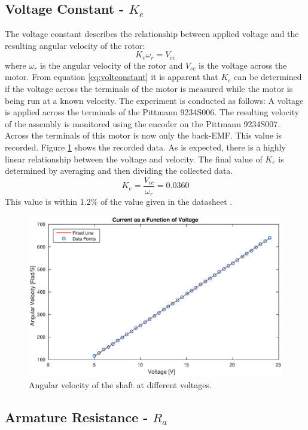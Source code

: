 \subsection{Voltage Constant - $K_e$}
\label{sec:voltconstat}
The voltage constant describes the relationship between applied voltage and the resulting angular velocity of the rotor:
\begin{equation}
	\label{eq:voltconstant}
	K_e\omega_r = V_{cc}
\end{equation}
where $\omega_r$ is the angular velocity of the rotor and $V_{cc}$ is the voltage across the motor.
From equation \ref{eq:voltconstant} it is apparent that $K_e$ can be determined if the voltage across the terminals of the motor is measured while the motor is being run at a known velocity.
The experiment is conducted as follows:
A voltage is applied across the terminals of the Pittmann 9234S006.
The resulting velocity of the assembly is monitored using the encoder on the Pittmann 9234S007.
Across the terminals of this motor is now only the back-EMF.
This value is recorded.
Figure \ref{fig:velvsvolt} shows the recorded data. 
As is expected, there is a highly linear relationship between the voltage and velocity.
The final value of $K_e$ is determined by averaging and then dividing the collected data.
$$K_e=\frac{V_{cc}}{\omega_r}=0.0360$$
This value is within 1.2\% of the value given in the datasheet \cite{pittmann}.

\begin{figure}[!h]
	\centering
	\includegraphics[width=\linewidth]{graphics/vvsrpm}
	\caption{Angular velocity of the shaft at different voltages.}
	\label{fig:velvsvolt}
\end{figure}

\subsection{Armature Resistance - $R_a$}
